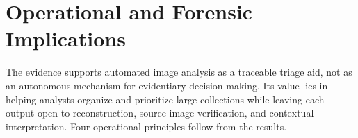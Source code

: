 \section{Operational and Forensic Implications}
\label{sec:conclusions-operational-implications}

The evidence supports automated image analysis as a traceable triage aid, not
as an autonomous mechanism for evidentiary decision-making. Its value lies in
helping analysts organize and prioritize large collections while leaving each
output open to reconstruction, source-image verification, and contextual
interpretation. Four operational principles follow from the results.

